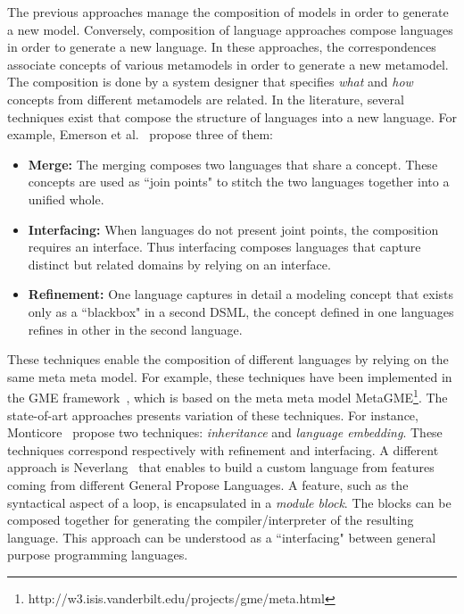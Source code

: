 
The previous approaches manage the composition of models in order to generate a new model. Conversely, composition of language approaches compose languages in order to generate a new language. In these approaches, the correspondences associate concepts of various metamodels in order to generate a new metamodel. The composition is done by a system designer that specifies \emph{what} and \emph{how} concepts from different metamodels are related. In the literature, several techniques exist that compose the structure of languages into a new language. For example, Emerson et al.~\cite{metamodelcompo} propose three of them:
\begin{itemize}
	\item \textbf{Merge:} The merging composes two languages that share a concept. These concepts are used as ``join points" to stitch the two languages together into a unified whole.
	\item \textbf{Interfacing:} When languages do not present joint points, the composition requires an interface. Thus interfacing composes languages that capture distinct but related domains by relying on an interface.
	\item \textbf{Refinement:} One language captures in detail a modeling concept that exists only as a ``blackbox" in a second DSML, \ie the concept defined in one languages refines in other in the second language.
\end{itemize} 
These techniques enable the composition of different languages by relying on the same meta meta model. For example, these techniques have been implemented in the GME framework~\cite{metamodelcompo}, which is based on the meta meta model MetaGME\footnote{http://w3.isis.vanderbilt.edu/projects/gme/meta.html}. The state-of-art approaches presents variation of these techniques. For instance, Monticore~\cite{monticore} propose two techniques: \emph{inheritance} and \emph{language embedding}. These techniques correspond respectively with refinement and interfacing. A different approach is Neverlang~\cite{neverlang} that enables to build a custom language from features coming from different General Propose Languages. A feature, such as the syntactical aspect of a loop, is encapsulated in a \emph{module block}. The blocks can be composed together for generating the compiler/interpreter of the resulting language. This approach can be understood as a ``interfacing" between general purpose programming languages.

